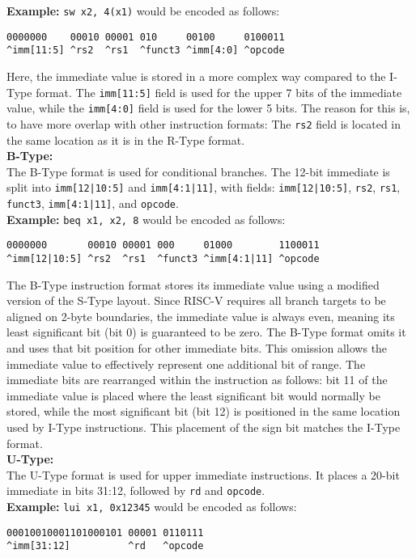 \documentclass[sigconf]{acmart}
\begin{document}
\textbf{Example:} \texttt{sw x2, 4(x1)} would be encoded as follows:
\begin{verbatim}
0000000    00010 00001 010     00100     0100011
^imm[11:5] ^rs2  ^rs1  ^funct3 ^imm[4:0] ^opcode
\end{verbatim}\medskip
Here, the immediate value is stored in a more complex way compared to the I-Type format. The \texttt{imm[11:5]} field is used for the upper 7 bits of the immediate value, while the \texttt{imm[4:0]} field is used for the lower 5 bits. The reason for this is, to have more overlap with other instruction formats: The \texttt{rs2} field is located in the same location as it is in the R-Type format. \\
%
\textbf{B-Type:} \\
The B-Type format is used for conditional branches. The 12-bit immediate is split into \texttt{imm[12|10:5]} and \texttt{imm[4:1|11]}, with fields: \texttt{imm[12|10:5]}, \texttt{rs2}, \texttt{rs1}, \texttt{funct3}, \texttt{imm[4:1|11]}, and \texttt{opcode}. \\
\textbf{Example:} \texttt{beq x1, x2, 8} would be encoded as follows:
\begin{verbatim}
0000000       00010 00001 000     01000        1100011
^imm[12|10:5] ^rs2  ^rs1  ^funct3 ^imm[4:1|11] ^opcode
\end{verbatim}\medskip
The B-Type instruction format stores its immediate value using a modified version of the S-Type layout. Since RISC-V requires all branch targets to be aligned on 2-byte boundaries, the immediate value is always even, meaning its least significant bit (bit 0) is guaranteed to be zero. The B-Type format omits it and uses that bit position for other immediate bits. This omission allows the immediate value to effectively represent one additional bit of range. The immediate bits are rearranged within the instruction as follows: bit 11 of the immediate value is placed where the least significant bit would normally be stored, while the most significant bit (bit 12) is positioned in the same location used by I-Type instructions. This placement of the sign bit matches the I-Type format. \cite{riscv-spec} \\
%
\textbf{U-Type:} \\
The U-Type format is used for upper immediate instructions. It places a 20-bit immediate in bits 31:12, followed by \texttt{rd} and \texttt{opcode}. \\
\textbf{Example:} \texttt{lui x1, 0x12345} would be encoded as follows:
\begin{verbatim}
00010010001101000101 00001 0110111
^imm[31:12]          ^rd   ^opcode
\end{verbatim}\medskip
\end{document}
